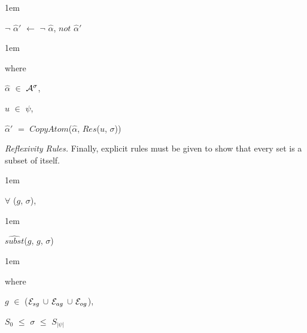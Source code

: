\documentclass[11pt]{report}
\newenvironment{vquote}
{
  \begin{list}{}{\leftmargin 1em}\item[]
}
{
  \end{list}
}
\begin{document}
\begin{enumerate}
\begin{vquote}
                  $\lnot$ $\hat{\alpha}'$ $\leftarrow$
                    $\lnot$ $\hat{\alpha}$, $not$ $\hat{\alpha}'$
                \end{vquote}

                \begin{vquote}
                  where

                  \hspace{1em}
                  $\hat{\alpha}$ $\in$ ${\cal A}^{\sigma}$,

                  \hspace{1em}
                  $u$ $\in$ $\psi$,

                  \hspace{1em}
                  $\hat{\alpha}'$ $=$
                  $CopyAtom$($\hat{\alpha}$, $Res$($u$, $\sigma$))
                \end{vquote}

              \item
                {\em Reflexivity Rules.}
                Finally, explicit rules must be given to show that every set is
                a subset of itself.

                \begin{vquote}
                  $\forall$ ($g$, $\sigma$),
                \end{vquote}

                \begin{vquote}
                  $\hat{subst}$($g$, $g$, $\sigma$)
                \end{vquote}

                \begin{vquote}
                  where

                  \hspace{1em}
                  $g$ $\in$
                    (${\cal E}_{sg}$ $\cup$ ${\cal E}_{ag}$ $\cup$ ${\cal E}_{og}$),

                  \hspace{1em}
                  $S_{0}$ $\leq$ $\sigma$ $\leq$ $S_{|\psi|}$
                \end{vquote}
            \end{enumerate}
\end{document}
